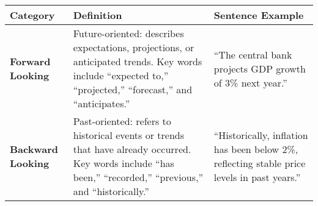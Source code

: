 \begin{table*}
    \caption{}
    \vpsace{1em}
    \centering
    \begin{tabular}{p{}p{}p{}}
        \toprule
        \textbf{Category} 
        & \textbf{Definition} 
        & \textbf{Sentence Example} \\
        \midrule
        \textbf{Forward Looking} 
        & Future-oriented: describes expectations, projections, or anticipated trends. Key words include ``expected to,'' ``projected,'' ``forecast,'' and ``anticipates.''
        & “The central bank projects GDP growth of 3\% next year.” \\
        \midrule
        
        \textbf{Backward Looking} 
        & Past-oriented: refers to historical events or trends that have already occurred. Key words include ``has been,'' ``recorded,'' ``previous,'' and ``historically.''
        & “Historically, inflation has been below 2\%, reflecting stable price levels in past years.” \\
        \bottomrule
    \end{tabular}
    \label{tb:cbc_forward_looking_guide}
\end{table*}

